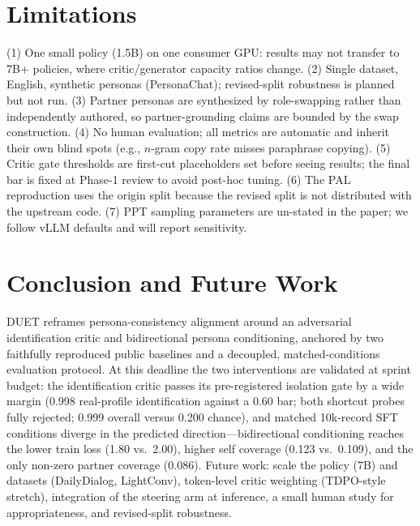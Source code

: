 \documentclass[lettersize,journal]{IEEEtran}
\begin{document}
\section{Limitations}
\label{sec:limitations}
(1) One small policy (1.5B) on one consumer GPU: results may not transfer to
7B+ policies, where critic/generator capacity ratios change.
(2) Single dataset, English, synthetic personas (PersonaChat); revised-split
robustness is planned but not run.
(3) Partner personas are synthesized by role-swapping rather than independently
authored, so partner-grounding claims are bounded by the swap construction.
(4) No human evaluation; all metrics are automatic and inherit their own blind
spots (e.g., $n$-gram copy rate misses paraphrase copying).
(5) Critic gate thresholds are first-cut placeholders set before seeing
results; the final bar is fixed at Phase-1 review to avoid post-hoc tuning.
(6) The PAL reproduction uses the origin split because the revised split is not
distributed with the upstream code.
(7) PPT sampling parameters are un-stated in the paper; we follow vLLM defaults
and will report sensitivity.

\section{Conclusion and Future Work}
DUET reframes persona-consistency alignment around an adversarial identification
critic and bidirectional persona conditioning, anchored by two faithfully
reproduced public baselines and a decoupled, matched-conditions evaluation
protocol. At this deadline the two interventions are validated at sprint
budget: the identification critic passes its pre-registered isolation gate by
a wide margin (0.998 real-profile identification against a 0.60 bar; both
shortcut probes fully rejected; 0.999 overall versus 0.200 chance), and matched
10k-record SFT conditions diverge in the predicted direction---bidirectional
conditioning reaches the lower train loss (1.80 vs.\ 2.00), higher self
coverage (0.123 vs.\ 0.109), and the only non-zero partner coverage (0.086).
Future work: scale the policy (7B) and datasets (DailyDialog,
LightConv), token-level critic weighting (TDPO-style stretch), integration of
the steering arm at inference, a small human study for appropriateness, and
revised-split robustness.
\end{document}
